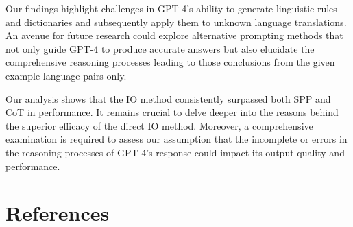 \documentclass[10pt, a4paper]{article}
\begin{document}
Our findings highlight challenges in GPT-4’s ability to generate linguistic rules and dictionaries and subsequently apply them to unknown language translations. An avenue for future research could explore alternative prompting methods that not only guide GPT-4 to produce accurate answers but also elucidate the comprehensive reasoning processes leading to those conclusions from the given example language pairs only.

Our analysis shows that the IO method consistently surpassed both SPP and CoT in performance. It remains crucial to delve deeper into the reasons behind the superior efficacy of the direct IO method. Moreover, a comprehensive examination is required to assess our assumption that the incomplete or errors in the reasoning processes of GPT-4’s response could impact its output quality and performance.



\nocite{*}
\section{References}\label{sec:reference}







\end{document}
